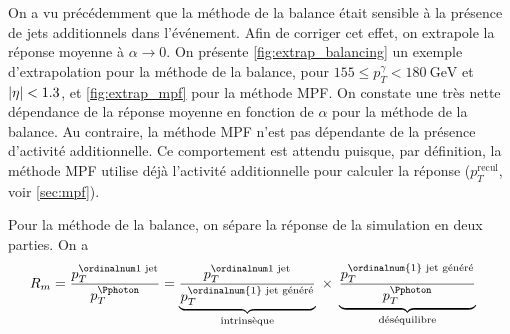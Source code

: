 
On a vu précédemment que la méthode de la balance était sensible à la présence de jets additionnels dans l'événement. Afin de corriger cet effet, on extrapole la réponse moyenne à $\alpha \rightarrow 0$. On présente \cref{fig:extrap_balancing} un exemple d'extrapolation pour la méthode de la balance, pour $155 \leq p_T^\gamma < \SI{180}{\GeV}$ et $\lvert \eta \rvert < \num{1.3}$, et \cref{fig:extrap_mpf} pour la méthode MPF. On constate une très nette dépendance de la réponse moyenne en fonction de $\alpha$ pour la méthode de la balance. Au contraire, la méthode MPF n'est pas dépendante de la présence d'activité additionnelle. Ce comportement est attendu puisque, par définition, la méthode MPF utilise déjà l'activité additionnelle pour calculer la réponse ($p_T^\text{recul}$, voir \cref{sec:mpf}).

Pour la méthode de la balance, on sépare la réponse de la simulation en deux parties. On a
\begin{align*}
  R_m &= \frac{\ptfjet}{\ptg} = \underbrace{ \frac{\ptfjet}{p_T^{\text{\ordinalnum{1} jet généré}}} }_{\text{intrinsèque}} \; \times \; \underbrace{ \frac{p_T^{\text{\ordinalnum{1} jet généré}}}{\ptg} }_{\text{déséquilibre}}
\end{align*}

